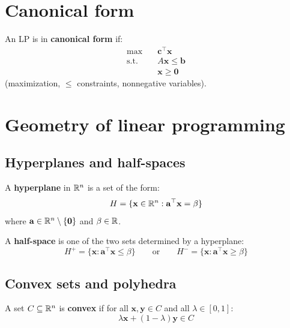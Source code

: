 \section{Canonical form}

\begin{definition}
An LP is in \textbf{canonical form} if:
\[
\begin{aligned}
  \max \quad & \mathbf{c}^\top \mathbf{x} \\
  \text{s.t.} \quad
    & A\mathbf{x} \le \mathbf{b} \\
    & \mathbf{x} \ge \mathbf{0}
\end{aligned}
\]
(maximization, $\le$ constraints, nonnegative variables).
\end{definition}

\section{Geometry of linear programming}

\subsection{Hyperplanes and half-spaces}

\begin{definition}[Hyperplane]
A \textbf{hyperplane} in $\mathbb{R}^n$ is a set of the form:
\[
  H = \{\mathbf{x} \in \mathbb{R}^n : \mathbf{a}^\top \mathbf{x} = \beta\}
\]
where $\mathbf{a} \in \mathbb{R}^n \setminus \{\mathbf{0}\}$ and $\beta \in \mathbb{R}$.
\end{definition}

\begin{definition}
A \textbf{half-space} is one of the two sets determined by a hyperplane:
\[
  H^+ = \{\mathbf{x} : \mathbf{a}^\top \mathbf{x} \le \beta\}
  \qquad \text{or} \qquad
  H^- = \{\mathbf{x} : \mathbf{a}^\top \mathbf{x} \ge \beta\}
\]
\end{definition}

\subsection{Convex sets and polyhedra}

\begin{definition}
A set $C \subseteq \mathbb{R}^n$ is \textbf{convex} if for all
$\mathbf{x}, \mathbf{y} \in C$ and all $\lambda \in [0,1]$:
\[
  \lambda \mathbf{x} + (1-\lambda)\mathbf{y} \in C
\]
\end{definition}

